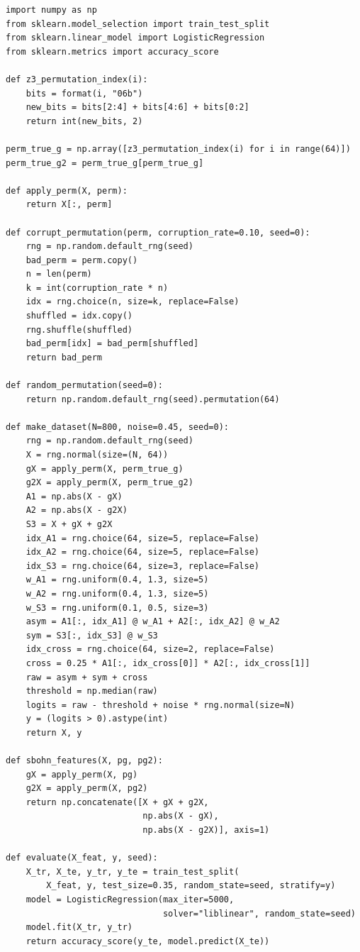 \documentclass[11pt,a4paper]{report}
\begin{document}
\label{app:ch3-lst17}
\begin{lstlisting}[caption=SBOHN Experiment 8: robustness to incorrect symmetry]
import numpy as np
from sklearn.model_selection import train_test_split
from sklearn.linear_model import LogisticRegression
from sklearn.metrics import accuracy_score

def z3_permutation_index(i):
    bits = format(i, "06b")
    new_bits = bits[2:4] + bits[4:6] + bits[0:2]
    return int(new_bits, 2)

perm_true_g = np.array([z3_permutation_index(i) for i in range(64)])
perm_true_g2 = perm_true_g[perm_true_g]

def apply_perm(X, perm):
    return X[:, perm]

def corrupt_permutation(perm, corruption_rate=0.10, seed=0):
    rng = np.random.default_rng(seed)
    bad_perm = perm.copy()
    n = len(perm)
    k = int(corruption_rate * n)
    idx = rng.choice(n, size=k, replace=False)
    shuffled = idx.copy()
    rng.shuffle(shuffled)
    bad_perm[idx] = bad_perm[shuffled]
    return bad_perm

def random_permutation(seed=0):
    return np.random.default_rng(seed).permutation(64)

def make_dataset(N=800, noise=0.45, seed=0):
    rng = np.random.default_rng(seed)
    X = rng.normal(size=(N, 64))
    gX = apply_perm(X, perm_true_g)
    g2X = apply_perm(X, perm_true_g2)
    A1 = np.abs(X - gX)
    A2 = np.abs(X - g2X)
    S3 = X + gX + g2X
    idx_A1 = rng.choice(64, size=5, replace=False)
    idx_A2 = rng.choice(64, size=5, replace=False)
    idx_S3 = rng.choice(64, size=3, replace=False)
    w_A1 = rng.uniform(0.4, 1.3, size=5)
    w_A2 = rng.uniform(0.4, 1.3, size=5)
    w_S3 = rng.uniform(0.1, 0.5, size=3)
    asym = A1[:, idx_A1] @ w_A1 + A2[:, idx_A2] @ w_A2
    sym = S3[:, idx_S3] @ w_S3
    idx_cross = rng.choice(64, size=2, replace=False)
    cross = 0.25 * A1[:, idx_cross[0]] * A2[:, idx_cross[1]]
    raw = asym + sym + cross
    threshold = np.median(raw)
    logits = raw - threshold + noise * rng.normal(size=N)
    y = (logits > 0).astype(int)
    return X, y

def sbohn_features(X, pg, pg2):
    gX = apply_perm(X, pg)
    g2X = apply_perm(X, pg2)
    return np.concatenate([X + gX + g2X,
                           np.abs(X - gX),
                           np.abs(X - g2X)], axis=1)

def evaluate(X_feat, y, seed):
    X_tr, X_te, y_tr, y_te = train_test_split(
        X_feat, y, test_size=0.35, random_state=seed, stratify=y)
    model = LogisticRegression(max_iter=5000,
                               solver="liblinear", random_state=seed)
    model.fit(X_tr, y_tr)
    return accuracy_score(y_te, model.predict(X_te))


\end{lstlisting}
\end{document}
